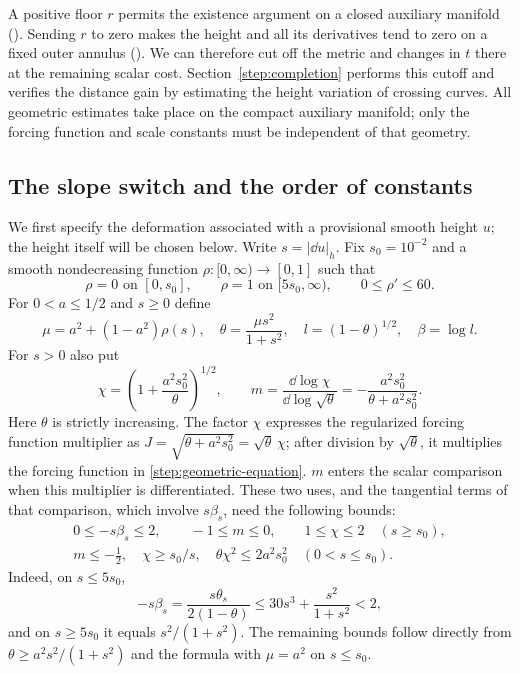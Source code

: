 A positive floor $r$ permits the existence argument on a closed
auxiliary manifold (). Sending $r$ to zero makes
the height and all its derivatives tend to zero on a fixed outer
annulus (). We can therefore cut off the metric and
changes in $t$ there at the remaining scalar cost. Section~\ref{step:completion}
performs this cutoff and verifies the distance gain by estimating the
height variation of crossing curves. All geometric estimates take place
on the compact auxiliary manifold; only the forcing function and scale constants
must be independent of that geometry.

\subsection{The slope switch and the order of constants}

We first specify the deformation associated with a provisional smooth
height $u$; the height itself will be chosen below. Write $s=|\dd u|_h$.
Fix $s_0=10^{-2}$ and a smooth nondecreasing function $\rho:[0,\infty)
\to[0,1]$ such that
\[
 \rho=0\text{ on }[0,s_0],\qquad
 \rho=1\text{ on }[5s_0,\infty),\qquad 0\le\rho'\le60.
\]
For $0<a\le1/2$ and $s\ge0$ define
\begin{equation}\label{step:switch}
 \mu=a^2+(1-a^2)\rho(s),\quad
 \theta=\frac{\mu s^2}{1+s^2},\quad
 l=(1-\theta)^{1/2},\quad \beta=\log l.
\end{equation}
For $s>0$ also put
\begin{equation}\label{step:chi}
 \chi=\left(1+\frac{a^2s_0^2}{\theta}\right)^{1/2},\qquad
 m=\frac{\dd\log\chi}{\dd\log\sqrt\theta}
   =-\frac{a^2s_0^2}{\theta+a^2s_0^2}.
\end{equation}
Here $\theta$ is strictly increasing. The factor $\chi$ expresses the
regularized forcing function multiplier as
$J=\sqrt{\theta+a^2s_0^2}=\sqrt\theta\,\chi$; after division by
$\sqrt\theta$, it multiplies the forcing function in
\eqref{step:geometric-equation}. $m$ enters
the scalar comparison when this multiplier is differentiated. These two
uses, and the tangential terms of that comparison, which involve
$s\beta_s$, need the following bounds:
\begin{equation}\label{step:switch-bounds}
\begin{gathered}
 0\le -s\beta_s\le2,\qquad -1\le m\le0,\qquad
 1\le\chi\le2\quad(s\ge s_0),\\
 m\le-\tfrac12,\quad \chi\ge s_0/s,\quad
 \theta\chi^2\le2a^2s_0^2\quad(0<s\le s_0).
\end{gathered}
\end{equation}
Indeed, on $s\le5s_0$,
\[
 -s\beta_s=\frac{s\theta_s}{2(1-\theta)}
 \le30s^3+\frac{s^2}{1+s^2}<2,
\]
and on $s\ge5s_0$ it equals $s^2/(1+s^2)$.  The remaining bounds follow
directly from $\theta\ge a^2s^2/(1+s^2)$ and the formula with $\mu=a^2$
on $s\le s_0$.

